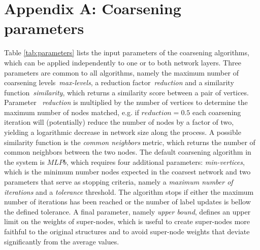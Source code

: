 \documentclass[runningheads]{llncs}
\begin{document}
\appendix

\newpage
\section*{Appendix A: Coarsening parameters}

Table \ref{tab:parameters} lists the input parameters of the coarsening algorithms, which can be applied independently to one or to both network layers. 
Three parameters are common to all algorithms, namely the maximum number of coarsening levels~\textit{max-levels}, a reduction factor~\textit{reduction} and a similarity function~\textit{similarity}, which returns a similarity score between a pair of vertices. Parameter ~\textit{reduction} is multiplied by the number of vertices to determine the maximum number of nodes matched, e.g. if $reduction = 0.5$ each coarsening iteration will (potentially) reduce the number of nodes by a factor of two, yielding a logarithmic decrease in network size along the process. 
A possible similarity function is the \emph{common neighbors} metric, which returns the number of common neighbors between the two nodes. The default coarsening algorithm in the system is $MLPb$, which requires four additional parameters: \textit{min-vertices}, which is the minimum number nodes expected in the coarsest network and two parameters that serve as stopping criteria, namely a \textit{maximum number of iterations} and a \textit{tolerance} threshold. The algorithm stops if either the maximum number of iterations has been reached or the number of label updates is bellow the defined tolerance. 
A final parameter, namely \textit{upper bound}, defines an upper limit on the weights of super-nodes, which is useful to create super-nodes more faithful to the original structures and to avoid super-node weights that deviate significantly from the average values.
\end{document}
